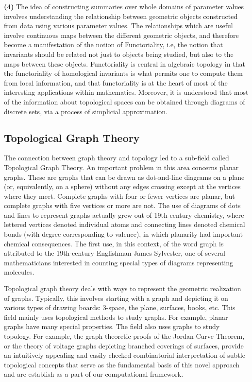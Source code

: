 \textbf{(4)} The idea of constructing summaries over whole domains of parameter values involves understanding the relationship between geometric objects constructed from data using various parameter values. The relationships which are useful involve continuous maps between the different geometric objects, and therefore become a manifestation of the notion of Functoriality, i.e,  the notion that invariants should be related not just to objects being studied, but also to the maps between these objects.\cite{05_mac2013Functoriality} Functoriality is central in algebraic topology in that the functoriality of homological invariants \cite{06.1_carlsson2008persistentHomo}is what permits one to compute them from local information, and that functoriality is at the heart of most of the interesting applications within mathematics. Moreover, it is understood that most of the information about topological spaces can be obtained through diagrams of discrete sets, via a process of simplicial approximation.\cite{03.1_2009simplicialHomotopy} \cite{08.2_1992simplicialAlgebricTopo}

\subsection{Topological Graph Theory}
The connection between graph theory and topology led to a sub-field called Topological Graph Theory.\cite{17.0_2001TGTIntro} \cite{17.1_2012foundationsTGT} An important problem in this area concerns planar graphs. These are graphs that can be drawn as dot-and-line diagrams on a plane (or, equivalently, on a sphere) without any edges crossing except at the vertices where they meet. Complete graphs with four or fewer vertices are planar, but complete graphs with five vertices or more are not. The use of diagrams of dots and lines to represent graphs actually grew out of 19th-century chemistry, where lettered vertices denoted individual atoms and connecting lines denoted chemical bonds (with degree corresponding to valence), in which planarity had important chemical consequences. The first use, in this context, of the word graph is attributed to the 19th-century Englishman James Sylvester, one of several mathematicians interested in counting special types of diagrams representing molecules.\cite{17.2_TGTonlineBritanica}

Topological graph theory deals with ways to represent the geometric realization of graphs. Typically, this involves starting with a graph and depicting
it on various types of drawing boards: 3-space, the plane, surfaces, books,
etc. This field mainly uses topological methods to study graphs. For example, planar graphs
have many special properties. The field also uses graphs to study topology.
For example, the graph theoretic proofs of the Jordan Curve Theorem, or
the theory of voltage graphs depicting branched coverings of surfaces, provide an intuitively appealing and easily checked combinatorial interpretation
of subtle topological concepts \cite{17.3_1996topologicalGT} \cite{17.1_2012foundationsTGT} that serve as the fundamental basis of this novel approach and are establish as a part of our computational framework. 

